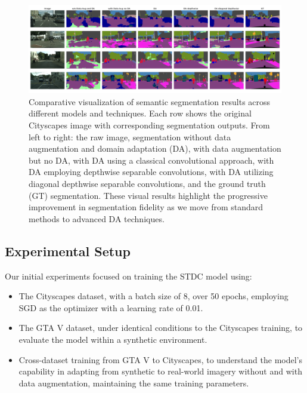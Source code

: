 \documentclass[conference]{IEEEtran}
\begin{document}
\begin{figure}[htbp]
  \centering
  \includegraphics[width=\textwidth]{figures/all.png}
  \caption{Comparative visualization of semantic segmentation results across different models and techniques. Each row shows the original Cityscapes image with corresponding segmentation outputs. From left to right: the raw image, segmentation without data augmentation and domain adaptation (DA), with data augmentation but no DA, with DA using a classical convolutional approach, with DA employing depthwise separable convolutions, with DA utilizing diagonal depthwise separable convolutions, and the ground truth (GT) segmentation. These visual results highlight the progressive improvement in segmentation fidelity as we move from standard methods to advanced DA techniques.}
  \label{fig:all_result}
\end{figure}


\subsection{Experimental Setup}

Our initial experiments focused on training the STDC model using:
\begin{itemize}
    \item The Cityscapes dataset, with a batch size of 8, over 50 epochs, employing SGD as the optimizer with a learning rate of 0.01.
    \item The GTA V dataset, under identical conditions to the Cityscapes training, to evaluate the model within a synthetic environment.
    \item Cross-dataset training from GTA V to Cityscapes, to understand the model's capability in adapting from synthetic to real-world imagery without and with data augmentation, maintaining the same training parameters.
\end{itemize}
\end{document}
